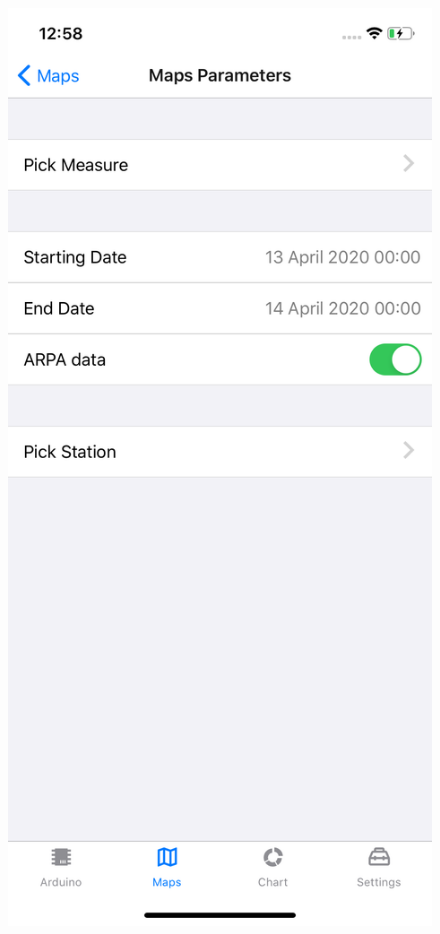 \begin{figure}[H]
\centering
\includegraphics[height=.6\textheight]{./img/ui/filter.png}

\end{figure}
